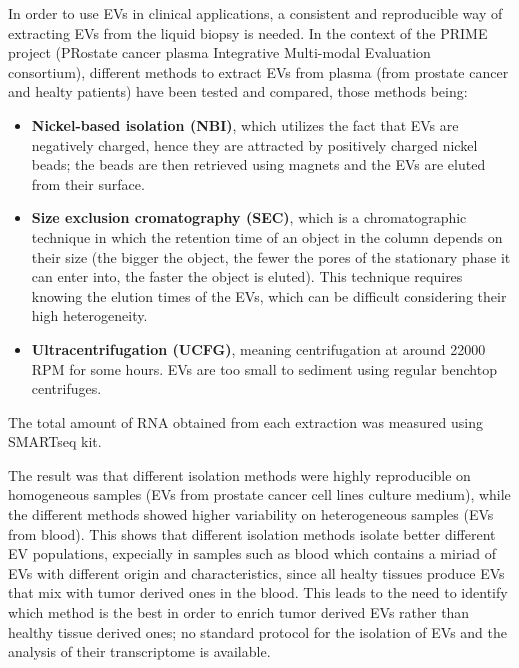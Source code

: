   In order to use EVs in clinical applications, a consistent and reproducible way of extracting EVs from the liquid biopsy is needed. In the context of the PRIME project (PRostate cancer plasma Integrative Multi-modal Evaluation consortium), different methods to extract EVs from plasma (from prostate cancer and healty patients) have been tested and compared, those methods being:
  \begin{itemize}
    \item \textbf{Nickel-based isolation (NBI)}, which utilizes the fact that EVs are negatively charged, hence they are attracted by positively charged nickel beads; the beads are then retrieved using magnets and the EVs are eluted from their surface. 
    \item \textbf{Size exclusion cromatography (SEC)}, which is a chromatographic technique in which the retention time of an object in the column depends on their size (the bigger the object, the fewer the pores of the stationary phase it can enter into, the faster the object is eluted). This technique requires knowing the elution times of the EVs, which can be difficult considering their high heterogeneity.
    \item \textbf{Ultracentrifugation (UCFG)}, meaning centrifugation at around 22000 RPM for some hours. EVs are too small to sediment using regular benchtop centrifuges. 
  \end{itemize}
  The total amount of RNA obtained from each extraction was measured using SMARTseq kit. 

  The result was that different isolation methods were highly reproducible on homogeneous samples (EVs from prostate cancer cell lines culture medium), while the different methods showed higher variability on heterogeneous samples (EVs from blood). This shows that different isolation methods isolate better different EV populations, expecially in samples such as blood which contains a miriad of EVs with different origin and characteristics, since all healty tissues produce EVs that mix with tumor derived ones in the blood. This leads to the need to identify which method is the best in order to enrich tumor derived EVs rather than healthy tissue derived ones; no standard protocol for the isolation of EVs and the analysis of their transcriptome is available. 
  
